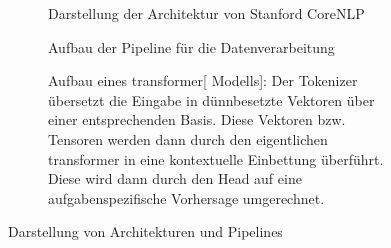 \nocite{stack:tex:two-subfigures-next-to-a-third-subfigure}
\begin{figure}
	\begin{subfigure}[b]{0.45\textwidth}
		\begin{tcolorbox}[tpipelinestyle]
			\begin{adjustbox}{center,max width=0.9\linewidth,max totalheight=0.9\textheight}
			\end{adjustbox}
		\end{tcolorbox}
		\caption{Darstellung der Architektur von Stanford CoreNLP \autocite[Figure 1]{P14-5010}}
		\label{fig:corenlp:architecture}
	\end{subfigure}
	\hfill
	\begin{subfigure}[b]{0.45\textwidth}
		\begin{tcolorbox}[tpipelinestyle]
			\begin{adjustbox}{center,max width=\linewidth,max totalheight=0.9\textheight}
			\end{adjustbox}
		\end{tcolorbox}
		\caption{Aufbau der Pipeline für die Datenverarbeitung}
		\label{fig:pipeline:nlp:machinelearning}

		\vfill

		\begin{tcolorbox}[tpipelinestyle]
			\begin{adjustbox}{center,max width=\linewidth,max totalheight=0.9\textheight}
			\end{adjustbox}
		\end{tcolorbox}
		\caption[Aufbau eines {\gls{transformer}[ Modells]}]{Aufbau eines \gls{transformer}[ Modells]:
			Der Tokenizer übersetzt die Eingabe in dünnbesetzte Vektoren über einer entsprechenden Basis.
			Diese Vektoren bzw.\, Tensoren werden dann durch den eigentlichen \gls{transformer}
			in eine kontextuelle Einbettung
			überführt.
			Diese wird dann durch den Head auf eine aufgabenspezifische Vorhersage umgerechnet.
		}
		\label{fig:huggingface:transformer}
	\end{subfigure}
	\caption{Darstellung von Architekturen und Pipelines}
\end{figure}

